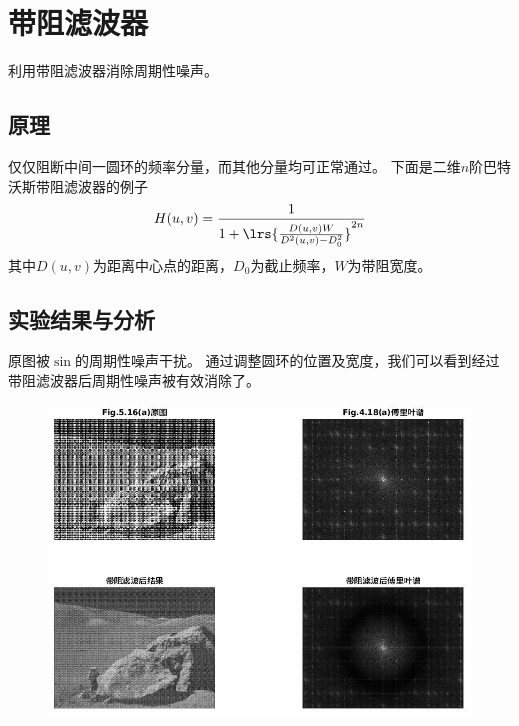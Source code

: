 \documentclass[logo,reportComp]{thesis}
\begin{document}
\section{带阻滤波器}
利用带阻滤波器消除周期性噪声。

\subsection{原理}
仅仅阻断中间一圆环的频率分量，而其他分量均可正常通过。
下面是二维$n$阶巴特沃斯带阻滤波器的例子
\[H(u,v)=\frac{1}{1+\lrs{\frac{D(u,v)W}{D^2(u,v)-D_0^2}}^{2n}}\]
其中$D(u,v)$为距离中心点的距离，$D_0$为截止频率，$W$为带阻宽度。

\subsection{实验结果与分析}
原图被$\sin$的周期性噪声干扰。
通过调整圆环的位置及宽度，我们可以看到经过带阻滤波器后周期性噪声被有效消除了。
\begin{figure}[H]
\centering
\includegraphics[width=\linewidth]{fig/br.jpg}
\end{figure}

\appendix\appendixconfig
\end{document}
